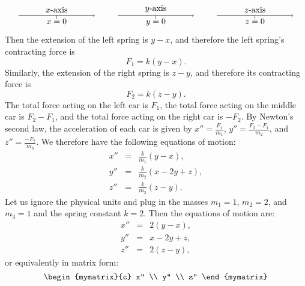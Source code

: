 \begin{solution}
\begin{equation*}
\begin{tikzpicture}[scale=0.8, color=blue!50!black]
\begin{scope}[yshift=-1cm, xshift=0cm, color=black]
        \draw[->] (1,0) -- node[above] {$x$-axis} +(4,0);
        \draw (3,0) -- +(0,-0.2) node[below=-4pt] {$x=0$};
      \end{scope}
      \begin{scope}[yshift=-1cm, xshift=5.2cm, color=black]
        \draw[->] (1,0) -- node[above] {$y$-axis} +(4,0);
        \draw (3,0) -- +(0,-0.2) node[below=-4pt] {$y=0$};
      \end{scope}
      \begin{scope}[yshift=-1cm, xshift=10.4cm, color=black]
        \draw[->] (1,0) -- node[above] {$z$-axis} +(4,0);
        \draw (3,0) -- +(0,-0.2) node[below=-4pt] {$z=0$};
      \end{scope}
    \end{tikzpicture}
  \end{equation*}
  Then the extension of the left spring is $y-x$, and therefore the
  left spring's contracting force is
  \begin{equation*}
    F_1 = k(y-x).
  \end{equation*}
  Similarly, the extension of the right spring is $z-y$, and therefore
  its contracting force is
  \begin{equation*}
    F_2 = k(z-y).
  \end{equation*}
  The total force acting on the left car is $F_1$, the total force
  acting on the middle car is $F_2-F_1$, and the total force acting on
  the right car is $-F_2$. By Newton's second law, the acceleration
  of each car is given by $x'' = \frac{F_1}{m_1}$,
  $y'' = \frac{F_2-F_1}{m_2}$, and $z''=\frac{-F_2}{m_3}$. We
  therefore have the following equations of motion:
  \begin{eqnarray*}
    x'' &=& \frac{k}{m_1}(y-x), \\
    y'' &=& \frac{k}{m_2}(x-2y+z), \\
    z'' &=& \frac{k}{m_3}(z-y).
  \end{eqnarray*}
  Let us ignore the physical units and plug in the masses $m_1=1$,
  $m_2=2$, and $m_3=1$ and the spring constant $k=2$. Then the equations
  of motion are:
  \begin{eqnarray*}
    x'' &=& 2(y-x), \\
    y'' &=& x-2y+z, \\
    z'' &=& 2(z-y),
  \end{eqnarray*}
  or equivalently in matrix form:
  \begin{equation*}
    \begin{mymatrix}{c} x'' \\ y'' \\ z'' \end{mymatrix}

\end{equation*}
\end{solution}
